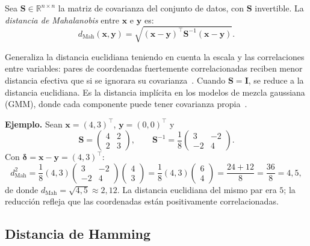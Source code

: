 \begin{definition}
Sea $\mathbf{S}\in\mathbb{R}^{n\times n}$ la matriz de covarianza del conjunto de datos, con $\mathbf{S}$ invertible. La \emph{distancia de Mahalanobis} entre $\mathbf{x}$ e $\mathbf{y}$ es:
\[
d_{\mathrm{Mah}}(\mathbf{x},\mathbf{y}) = \sqrt{(\mathbf{x}-\mathbf{y})^{\top}\mathbf{S}^{-1}(\mathbf{x}-\mathbf{y})}.
\]
\end{definition}

Generaliza la distancia euclidiana teniendo en cuenta la escala y las correlaciones entre variables: pares de coordenadas fuertemente correlacionadas reciben menor distancia efectiva que si se ignorara su covarianza~\cite{demaesschalck2000mahalanobis}. Cuando $\mathbf{S} = \mathbf{I}$, se reduce a la distancia euclidiana. Es la distancia implícita en los modelos de mezcla gaussiana (GMM), donde cada componente puede tener covarianza propia~\cite{duda2001pattern}.

\textbf{Ejemplo.} Sean $\mathbf{x}=(4,3)^{\top}$, $\mathbf{y}=(0,0)^{\top}$ y
\[
\mathbf{S} = \begin{pmatrix}4 & 2\\ 2 & 3\end{pmatrix}, \qquad
\mathbf{S}^{-1} = \frac{1}{8}\begin{pmatrix}3 & -2\\ -2 & 4\end{pmatrix}.
\]
Con $\boldsymbol{\delta} = \mathbf{x}-\mathbf{y} = (4,3)^{\top}$:
\[
d_{\mathrm{Mah}}^2
= \frac{1}{8}(4,3)
\begin{pmatrix}3 & -2\\-2 & 4\end{pmatrix}
\begin{pmatrix}4\\3\end{pmatrix}
= \frac{1}{8}(4,3)\begin{pmatrix}6\\4\end{pmatrix}
= \frac{24+12}{8} = \frac{36}{8} = 4{,}5,
\]
de donde $d_{\mathrm{Mah}} = \sqrt{4{,}5} \approx 2{,}12$. La distancia euclidiana del mismo par era $5$; la reducción refleja que las coordenadas están positivamente correlacionadas.

\subsection{Distancia de Hamming}

